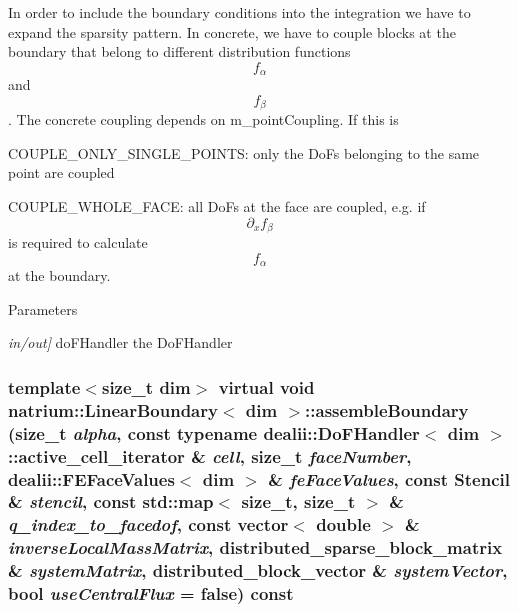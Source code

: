 In order to include the boundary conditions into the integration we have to expand the sparsity pattern. In concrete, we have to couple blocks at the boundary that belong to different distribution functions \[ f_{\alpha} \] and \[ f_{\beta} \]. The concrete coupling depends on m\_\-pointCoupling. If this is
\begin{DoxyItemize}
\item COUPLE\_\-ONLY\_\-SINGLE\_\-POINTS: only the DoFs belonging to the same point are coupled
\item COUPLE\_\-WHOLE\_\-FACE: all DoFs at the face are coupled, e.g. if \[ \partial_{x}f_{\beta} \] is required to calculate \[ f_{\alpha} \] at the boundary. 
\end{DoxyItemize}
\begin{DoxyParams}{Parameters}
\item[{\em in/out\mbox{]}}]doFHandler the DoFHandler \end{DoxyParams}
\hypertarget{classnatrium_1_1LinearBoundary_a4f6ff88796031a747cab3db1be4ac603}{
\subsubsection[{assembleBoundary}]{\setlength{\rightskip}{0pt plus 5cm}template$<$size\_\-t dim$>$ virtual void {\bf natrium::LinearBoundary}$<$ dim $>$::assembleBoundary (size\_\-t {\em alpha}, \/  const typename dealii::DoFHandler$<$ dim $>$::active\_\-cell\_\-iterator \& {\em cell}, \/  size\_\-t {\em faceNumber}, \/  dealii::FEFaceValues$<$ dim $>$ \& {\em feFaceValues}, \/  const {\bf Stencil} \& {\em stencil}, \/  const std::map$<$ size\_\-t, size\_\-t $>$ \& {\em q\_\-index\_\-to\_\-facedof}, \/  const vector$<$ double $>$ \& {\em inverseLocalMassMatrix}, \/  distributed\_\-sparse\_\-block\_\-matrix \& {\em systemMatrix}, \/  distributed\_\-block\_\-vector \& {\em systemVector}, \/  bool {\em useCentralFlux} = {\ttfamily false}) const}}
\label{classnatrium_1_1LinearBoundary_a4f6ff88796031a747cab3db1be4ac603}


